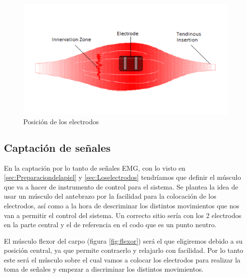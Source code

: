 \begin{figure}[H]
	\center
	\includegraphics[scale=0.8]{imagenes/Implementaciondelsistema/electrodo.png}
	\caption{Posición de los electrodos}
	\label{fig:Posicion}
\end{figure}

\subsection{Captación de señales}

En la captación por lo tanto de señales EMG, con lo visto en \ref{sec:Preparaciondelapiel} y \ref{sec:Loselectrodos} tendríamos que definir el músculo que va a hacer de instrumento de control para el sistema. Se plantea la idea de usar un músculo del antebrazo por la facilidad para la colocación de los electrodos, así como a la hora de descriminar los distintos movimientos que nos van a permitir el control del sistema. Un correcto sitio sería con los 2 electrodos en la parte central y el de referencia en el codo que es un punto neutro.\newline 

El músculo flexor del carpo (figura \ref{fig:flexor}) será  el que eligiremos debido a su posición central, ya que permite contraerlo y relajarlo con facilidad. \newline Por lo tanto este será el músculo sobre el cual vamos a colocar los electrodos para realizar la toma de señales y empezar a discriminar los distintos movimientos.  

